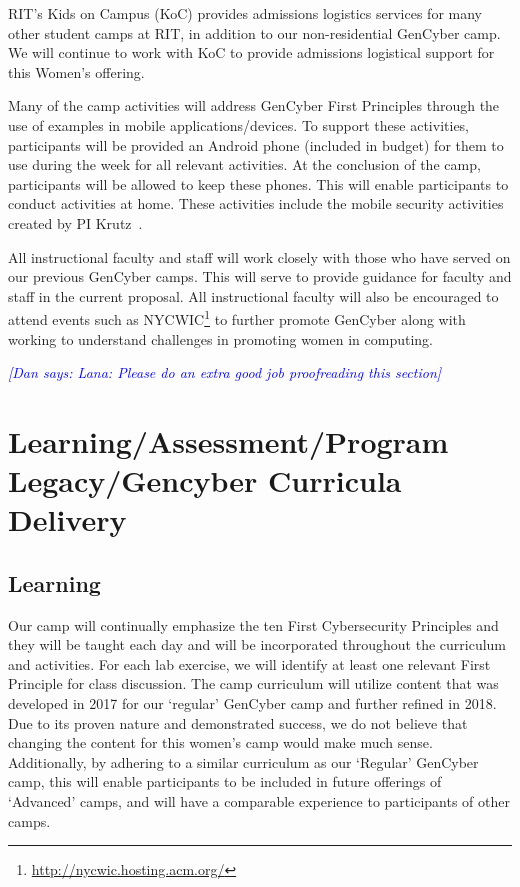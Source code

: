 \documentclass[12pt]{article}
\newcommand{\dan}[1]{\textcolor{blue}{{\it [Dan says: #1]}}}
\begin{document}
RIT's Kids on Campus (KoC) provides admissions logistics services for many other student camps at RIT, in addition to our non-residential GenCyber camp. We will continue to work with KoC to provide admissions logistical support for this Women's offering. 

Many of the camp activities will address GenCyber First Principles through the use of examples in mobile applications/devices. To support these activities, participants will be provided an Android phone (included in budget) for them to use during the week for all relevant activities. At the conclusion of the camp, participants will be allowed to keep these phones. This will enable participants to conduct activities at home. These activities include the mobile security activities created by PI Krutz~\cite{Krutz:2016:TAS:3018995.2994152, PLASMA_ProjectWebsite_URL}.

All instructional faculty and staff will work closely with those who have served on our previous GenCyber camps. This will serve to provide guidance for faculty and staff in the current proposal. All instructional faculty will also be encouraged to attend events such as NYCWIC\footnote{\url{http://nycwic.hosting.acm.org/}} to further promote GenCyber along with working to understand challenges in promoting women in computing.


\dan{Lana: Please do an extra good job proofreading this section}






\section{Learning/Assessment/Program Legacy/Gencyber Curricula Delivery}


\subsection{Learning}

Our camp will continually emphasize the ten First Cybersecurity Principles and they will be taught each day and will be incorporated throughout the curriculum and activities. For each lab exercise, we will identify at least one relevant First Principle for class discussion. The camp curriculum will utilize content that was developed in 2017 for our `regular' GenCyber camp and further refined in 2018. Due to its proven nature and demonstrated success, we do not believe that changing the content for this women's camp would make much sense. Additionally, by adhering to a similar curriculum as our `Regular' GenCyber camp, this will enable participants to be included in future offerings of `Advanced' camps, and will have a comparable experience to participants of other camps.
\end{document}
